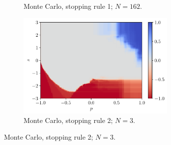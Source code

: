 \documentclass[a4paper, 12pt]{article}
\begin{document}
\begin{figure}[H]
\begin{subfigure}{0.49\textwidth}
            \caption{Monte Carlo, stopping rule 1; $N = 162$.}
        \end{subfigure}
        \hfill
        \begin{subfigure}{0.49\textwidth}
            \centering
            \includegraphics[width=0.85\textwidth]{resources/pdf/4_montecarlo_2_XRT_q_-4.pdf}
            \caption{Monte Carlo, stopping rule 2; $N = 3$.}
        \end{subfigure}
        \label{fig:qn.xrt.minus.4}
    \end{figure}
    
\end{document}

